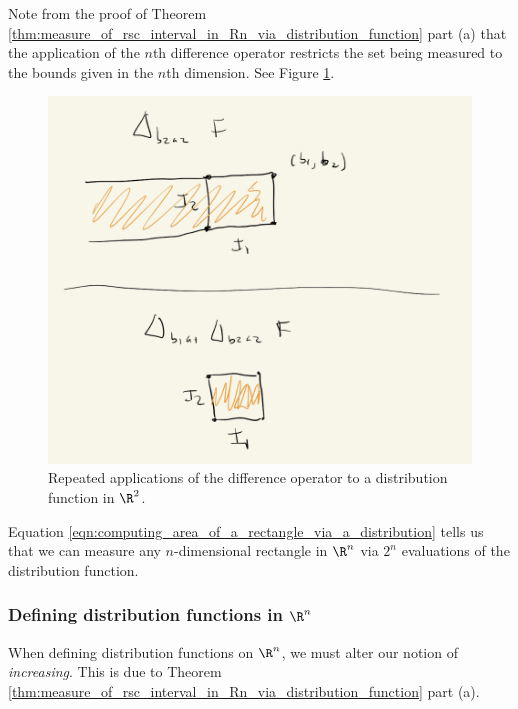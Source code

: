 \documentclass{article} %
\begin{document}
\begin{remark}
Note from the proof of Theorem \ref{thm:measure_of_rsc_interval_in_Rn_via_distribution_function} part (a) that the application of the $n$th difference operator restricts the set being measured to the bounds given in the $n$th dimension.  See Figure \ref{fig:applying_the_difference_operator_to_distribution_functions_in_R2}.

\begin{figure}[H]
\centering
\includegraphics[width=.5\textwidth]{images/applying_the_difference_operator_to_distribution_functions_in_R2}	
\caption{Repeated applications of the difference operator to a distribution function in $\R^2$.}
\label{fig:applying_the_difference_operator_to_distribution_functions_in_R2}
\end{figure}


\end{remark}

\begin{remark}
Equation \eqref{eqn:computing_area_of_a_rectangle_via_a_distribution} tells us that we can measure any $n$-dimensional rectangle in $\R^n$ via $2^n$ evaluations of the distribution function. 
\end{remark}


\subsubsection{Defining distribution functions in $\R^n$}

When defining distribution functions on $\R^n$,  we must alter our notion of \textit{increasing}.     This is due to Theorem \ref{thm:measure_of_rsc_interval_in_Rn_via_distribution_function} part (a).
\end{document}
